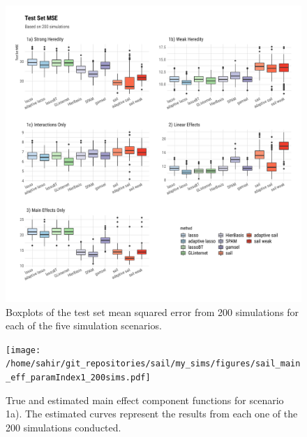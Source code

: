\begin{knitrout}\scriptsize
	\color{fgcolor}\begin{figure}[h]
		
		{\centering \includegraphics[width=1\linewidth]{figure/plot-mse-sim-1} 
			
		}
		
		\caption[Boxplots of the test set mean squared error from 200 simulations for each of the five simulation scenarios]{Boxplots of the test set mean squared error from 200 simulations for each of the five simulation scenarios.}\label{fig:plot-mse-sim}
	\end{figure}
	
	
\end{knitrout}



\begin{figure}[h]
	\centering
	\texttt{[image: /home/sahir/git\_repositories/sail/my\_sims/figures/sail\_main\_eff\_paramIndex1\_200sims.pdf]}
	\caption{True and estimated main effect component functions for scenario 1a). The estimated curves represent the results from each one of the 200 simulations conducted.}\label{fig:main_eff}
\end{figure}


